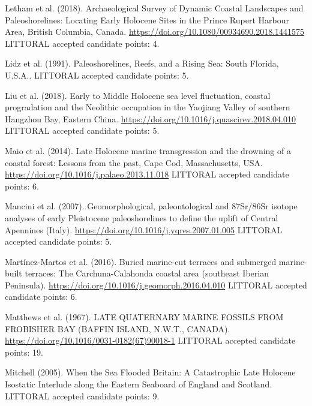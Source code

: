\documentclass[twocolumn,10pt]{article}
\begin{document}
\begin{thebibliography}{}
Letham et al. (2018).
\newblock Archaeological Survey of Dynamic Coastal Landscapes and Paleoshorelines: Locating Early Holocene Sites in the Prince Rupert Harbour Area, British Columbia, Canada.
\newblock \url{https://doi.org/10.1080/00934690.2018.1441575}
\newblock LITTORAL accepted candidate points: 4.

Lidz et al. (1991).
\newblock Paleoshorelines, Reefs, and a Rising Sea: South Florida, U.S.A..
\newblock LITTORAL accepted candidate points: 5.

Liu et al. (2018).
\newblock Early to Middle Holocene sea level fluctuation, coastal progradation and the Neolithic occupation in the Yaojiang Valley of southern Hangzhou Bay, Eastern China.
\newblock \url{https://doi.org/10.1016/j.quascirev.2018.04.010}
\newblock LITTORAL accepted candidate points: 5.

Maio et al. (2014).
\newblock Late Holocene marine transgression and the drowning of a coastal forest: Lessons from the past, Cape Cod, Massachusetts, USA.
\newblock \url{https://doi.org/10.1016/j.palaeo.2013.11.018}
\newblock LITTORAL accepted candidate points: 6.

Mancini et al. (2007).
\newblock Geomorphological, paleontological and 87Sr/86Sr isotope analyses of early Pleistocene paleoshorelines to define the uplift of Central Apennines (Italy).
\newblock \url{https://doi.org/10.1016/j.yqres.2007.01.005}
\newblock LITTORAL accepted candidate points: 5.

Martínez-Martos et al. (2016).
\newblock Buried marine-cut terraces and submerged marine-built terraces: The Carchuna-Calahonda coastal area (southeast Iberian Peninsula).
\newblock \url{https://doi.org/10.1016/j.geomorph.2016.04.010}
\newblock LITTORAL accepted candidate points: 6.

Matthews et al. (1967).
\newblock LATE QUATERNARY MARINE FOSSILS FROM FROBISHER BAY (BAFFIN ISLAND, N.W.T., CANADA).
\newblock \url{https://doi.org/10.1016/0031-0182(67)90018-1}
\newblock LITTORAL accepted candidate points: 19.

Mitchell (2005).
\newblock When the Sea Flooded Britain: A Catastrophic Late Holocene Isostatic Interlude along the Eastern Seaboard of England and Scotland.
\newblock LITTORAL accepted candidate points: 9.


\end{thebibliography}
\end{document}
